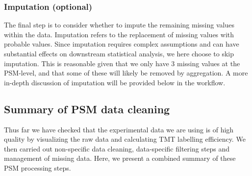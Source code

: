 \documentclass[9pt,a4paper,]{extarticle}
\begin{document}
\subsubsection{Imputation (optional)}\label{imputation-optional}

The final step is to consider whether to impute the remaining missing values
within the data. Imputation refers to the replacement of missing values with
probable values. Since imputation requires complex assumptions and can have
substantial effects on downstream statistical analysis, we here choose to skip
imputation. This is reasonable given that we only have 3 missing values at the
PSM-level, and that some of these will likely be removed by aggregation. A more
in-depth discussion of imputation will be provided below in the workflow.

\subsection{Summary of PSM data cleaning}\label{summary-of-psm-data-cleaning}

Thus far we have checked that the experimental data we are using is of high
quality by visualizing the raw data and calculating TMT labelling efficiency. We
then carried out non-specific data cleaning, data-specific filtering steps and
management of missing data. Here, we present a combined summary of these PSM
processing steps.
\end{document}
